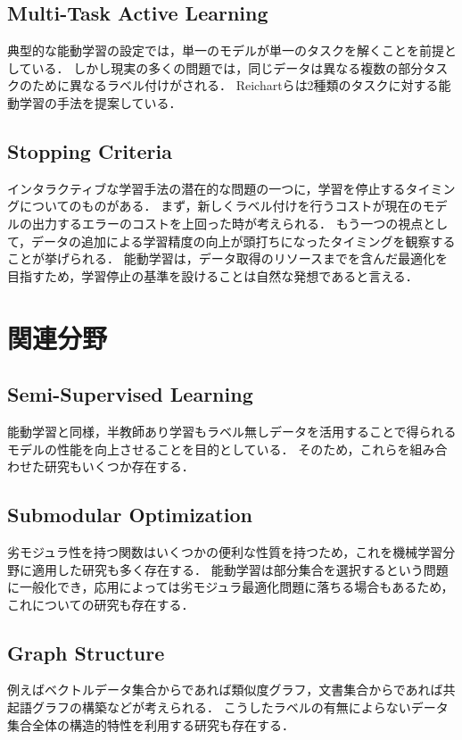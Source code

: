 \documentclass[11pt]{report}
\begin{document}
\subsection{Multi-Task Active Learning}
典型的な能動学習の設定では，単一のモデルが単一のタスクを解くことを前提としている．
しかし現実の多くの問題では，同じデータは異なる複数の部分タスクのために異なるラベル付けがされる．
Reichartら\cite{reichart2008multi}は2種類のタスクに対する能動学習の手法を提案している．

\subsection{Stopping Criteria}
インタラクティブな学習手法の潜在的な問題の一つに，学習を停止するタイミングについてのものがある．
まず，新しくラベル付けを行うコストが現在のモデルの出力するエラーのコストを上回った時が考えられる．
もう一つの視点として，データの追加による学習精度の向上が頭打ちになったタイミングを観察することが挙げられる．
能動学習は，データ取得のリソースまでを含んだ最適化を目指すため，学習停止の基準を設けることは自然な発想であると言える．

\section{関連分野}

\subsection{Semi-Supervised Learning}
能動学習と同様，半教師あり学習もラベル無しデータを活用することで得られるモデルの性能を向上させることを目的としている．
そのため，これらを組み合わせた研究もいくつか存在する\cite{zhu2003combining}\cite{muslea2002active+}．

\subsection{Submodular Optimization}
劣モジュラ性を持つ関数はいくつかの便利な性質を持つため，これを機械学習分野に適用した研究も多く存在する．
能動学習は部分集合を選択するという問題に一般化でき，応用によっては劣モジュラ最適化問題に落ちる場合もあるため，
これについての研究も存在する\cite{golovin2011adaptive}\cite{golovin2010adaptive}．

\subsection{Graph Structure}
例えばベクトルデータ集合からであれば類似度グラフ，文書集合からであれば共起語グラフの構築などが考えられる．
こうしたラベルの有無によらないデータ集合全体の構造的特性を利用する研究も存在する\cite{jun2016graph}\cite{dasarathy2015s2}．



\end{document}
